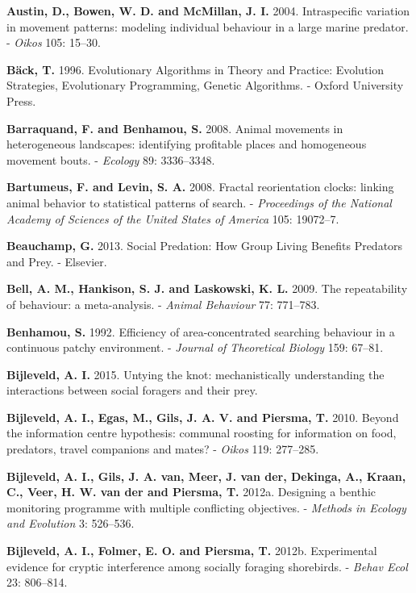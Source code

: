 \documentclass[]{scrartcl}
\begin{document}
\begin{multicols}{2}
	
	\footnotesize

\protect\hypertarget{__UnoMark__39709_623588325}{}{}\textbf{Austin, D.,
Bowen, W. D. and McMillan, J. I.} 2004. Intraspecific variation in
movement patterns: modeling individual behaviour in a large marine
predator. - \emph{Oikos} 105: 15--30.

\textbf{Bäck, T.} 1996. Evolutionary Algorithms in Theory and Practice:
Evolution Strategies, Evolutionary Programming, Genetic Algorithms. -
Oxford University Press.

\textbf{Barraquand, F. and Benhamou, S.} 2008. Animal movements in
heterogeneous landscapes: identifying profitable places and homogeneous
movement bouts. - \emph{Ecology} 89: 3336--3348.

\textbf{Bartumeus, F. and Levin, S. A.} 2008. Fractal reorientation
clocks: linking animal behavior to statistical patterns of search. -
\emph{Proceedings of the National Academy of Sciences of the United
States of America} 105: 19072--7.

\textbf{Beauchamp, G.} 2013. Social Predation: How Group Living Benefits
Predators and Prey. - Elsevier.

\textbf{Bell, A. M., Hankison, S. J. and Laskowski, K. L.} 2009. The
repeatability of behaviour: a meta-analysis. - \emph{Animal Behaviour}
77: 771--783.

\textbf{Benhamou, S.} 1992. Efficiency of area-concentrated searching
behaviour in a continuous patchy environment. - \emph{Journal of
Theoretical Biology} 159: 67--81.

\textbf{Bijleveld, A. I.} 2015. Untying the knot: mechanistically
understanding the interactions between social foragers and their prey.

\textbf{Bijleveld, A. I., Egas, M., Gils, J. A. V. and Piersma, T.}
2010. Beyond the information centre hypothesis: communal roosting for
information on food, predators, travel companions and mates? -
\emph{Oikos} 119: 277--285.

\textbf{Bijleveld, A. I., Gils, J. A. van, Meer, J. van der, Dekinga,
A., Kraan, C., Veer, H. W. van der and Piersma, T.} 2012a. Designing a
benthic monitoring programme with multiple conflicting objectives. -
\emph{Methods in Ecology and Evolution} 3: 526--536.

\textbf{Bijleveld, A. I., Folmer, E. O. and Piersma, T.} 2012b.
Experimental evidence for cryptic interference among socially foraging
shorebirds. - \emph{Behav Ecol} 23: 806--814.


\end{multicols}
\end{document}
